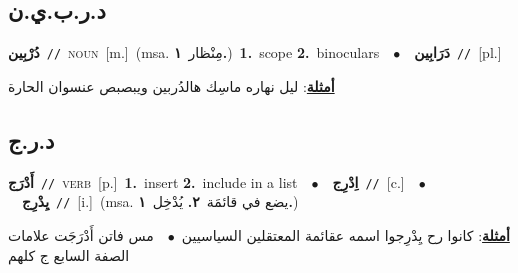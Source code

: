 \documentclass[10pt,a4paper,twoside]{article} %
\begin{document}
\begin{multicols}{2}
\vspace{-3mm}
\subsection*{\color{blue}\foreignlanguage{arabic}{د.ر.ب.ي.ن}\color{blue}{ (ntws)}} 

{\setlength\topsep{0pt}\textbf{\foreignlanguage{arabic}{دُرْبِين}}\ {\color{gray}\texttt{//}\color{black}}\ \textsc{noun}\ [m.]\ \color{gray}(msa. \foreignlanguage{arabic}{مِنْظار}~\foreignlanguage{arabic}{\textbf{١.}})\color{black}\ \textbf{1.}~scope  \textbf{2.}~binoculars\ \ $\bullet$\ \ \setlength\topsep{0pt}\textbf{\foreignlanguage{arabic}{دَرَابِين}}\ {\color{gray}\texttt{//}\color{black}}\ [pl.]\  \begin{flushright}\color{gray}\foreignlanguage{arabic}{\textbf{\underline{\foreignlanguage{arabic}{أمثلة}}}: ليل نهاره ماسِك هالدُربين  ويبصبص عنسوان الحارة}\end{flushright}\color{black}} \vspace{2mm}

\vspace{-3mm}
\subsection*{\color{blue}\foreignlanguage{arabic}{د.ر.ج}\color{blue}{}} 

{\setlength\topsep{0pt}\textbf{\foreignlanguage{arabic}{أَدْرَج}}\ {\color{gray}\texttt{//}\color{black}}\ \textsc{verb}\ [p.]\ \textbf{1.}~insert  \textbf{2.}~include in a list\ \ $\bullet$\ \ \setlength\topsep{0pt}\textbf{\foreignlanguage{arabic}{اِدْرِج}}\ {\color{gray}\texttt{//}\color{black}}\ [c.]\ \ $\bullet$\ \ \setlength\topsep{0pt}\textbf{\foreignlanguage{arabic}{يِدْرِج}}\ {\color{gray}\texttt{//}\color{black}}\ [i.]\ \color{gray}(msa. \foreignlanguage{arabic}{يضع في قائمَة}~\foreignlanguage{arabic}{\textbf{٢.}}  \foreignlanguage{arabic}{يُدْخِل}~\foreignlanguage{arabic}{\textbf{١.}})\color{black}\  \begin{flushright}\color{gray}\foreignlanguage{arabic}{\textbf{\underline{\foreignlanguage{arabic}{أمثلة}}}: كانوا رح يِدْرِجوا اسمه عقائمة المعتقلين السياسيين\ $\bullet$\ \  مس فاتن أَدْرَجَت علامات الصفة السابع ج كلهم}\end{flushright}\color{black}} \vspace{2mm}


\end{multicols}
\end{document}
